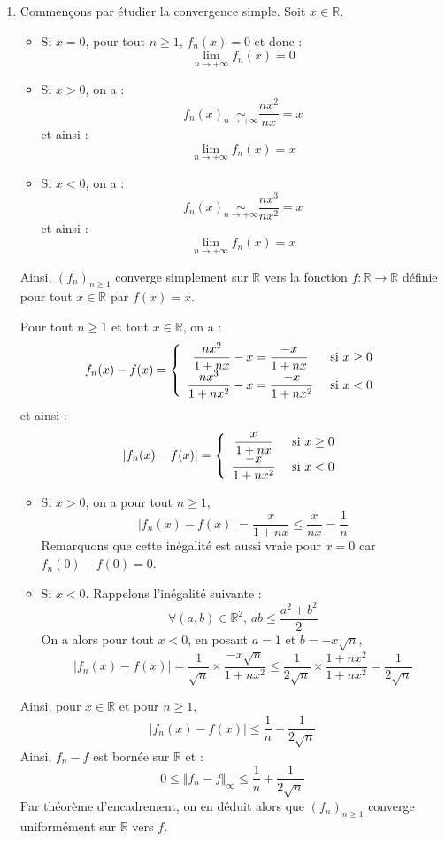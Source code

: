 \documentclass[a4paper,10pt]{report}
\begin{document}
\corr \begin{enumerate}
\item Commençons par étudier la convergence simple. Soit $x \in \mathbb{R}$.
\begin{itemize}
\item Si $x=0$, pour tout $n \geq 1$, $f_n(x)=0$ et donc :
$$ \lim_{n \rightarrow + \infty} f_n(x)=0$$
\item Si $x>0$, on a :
$$ f_n(x) \underset{n \rightarrow + \infty}{\sim} \dfrac{nx^2}{nx} = x$$
et ainsi :
$$ \lim_{n \rightarrow + \infty} f_n(x)=x$$
\item Si $x<0$, on a :
$$ f_n(x) \underset{n \rightarrow + \infty}{\sim} \dfrac{nx^3}{nx^2} = x$$
et ainsi :
$$ \lim_{n \rightarrow + \infty} f_n(x)=x$$
\end{itemize}
Ainsi, $(f_n)_{n \geq 1}$ converge simplement sur $\mathbb{R}$ vers la fonction $f : \mathbb{R} \rightarrow \mathbb{R}$ définie pour tout $x \in \mathbb{R}$ par $f(x)=x$.

\medskip

\noindent Pour tout $n \geq 1$ et tout $x \in \mathbb{R}$, on a :
$$ f_n(x)-f(x)= \left\lbrace \begin{array}{cl}
\dfrac{nx^2}{1+nx}-x = \dfrac{-x}{1+nx} & \hbox{ si } x \geq 0 \\
\dfrac{nx^3}{1+nx^2}-x =  \dfrac{-x}{1+nx^2}& \hbox{ si } x < 0 \\
\end{array}\right.$$
et ainsi :
$$ \vert f_n(x)-f(x) \vert = \left\lbrace \begin{array}{cl}
 \dfrac{x}{1+nx} & \hbox{ si } x \geq 0 \\
 \dfrac{-x}{1+nx^2}& \hbox{ si } x < 0 \\
\end{array}\right.$$
\begin{itemize}
\item Si $x > 0$, on a pour tout $n \geq 1$,
$$  \vert f_n(x)-f(x) \vert = \dfrac{x}{1+nx} \leq \dfrac{x}{nx} = \dfrac{1}{n}$$
Remarquons que cette inégalité est aussi vraie pour $x=0$ car $f_n(0)-f(0)=0$.
\item Si $x<0$. Rappelons l'inégalité suivante :
$$ \forall (a,b) \in \mathbb{R}^2, \, ab \leq \dfrac{a^2+b^2}{2}$$
On a alors pour tout $x<0$, en posant $a=1$ et $b=-x \sqrt{n}$,
$$ \vert f_n(x)-f(x) \vert = \dfrac{1}{\sqrt{n}} \times \dfrac{ -x \sqrt{n}}{1+nx^2} \leq \dfrac{1}{2\sqrt{n}} \times \dfrac{1+nx^2}{1+nx^2} = \dfrac{1}{2\sqrt{n}}$$
\end{itemize}
Ainsi, pour $x \in \mathbb{R}$ et pour $n \geq 1$, 
$$  \vert f_n(x)-f(x) \vert \leq \dfrac{1}{n} + \dfrac{1}{2\sqrt{n}}$$
Ainsi, $f_n-f$ est bornée sur $\mathbb{R}$ et :
$$ 0 \leq \Vert f_n-f \Vert_{\infty} \leq \dfrac{1}{n} + \dfrac{1}{2\sqrt{n}}$$
Par théorème d'encadrement, on en déduit alors que $(f_n)_{n \geq 1}$ converge uniformément sur $\mathbb{R}$ vers $f$.


\end{enumerate}
\end{document}
